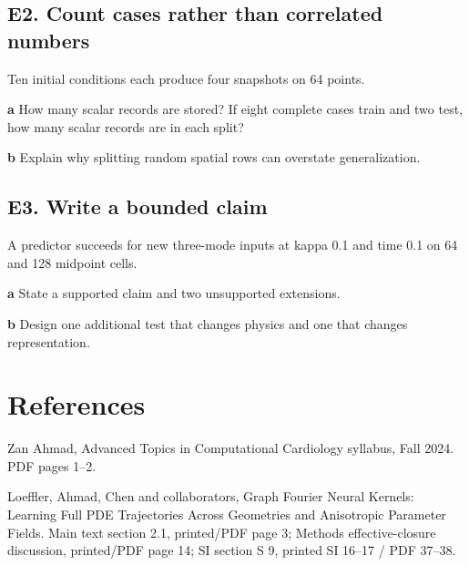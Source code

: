 \documentclass[11pt,letterpaper]{article}
\theoremstyle{definition}\newtheorem{definition}{Definition}\newtheorem{example}{Example}
\numberwithin{equation}{section}
\begin{document}
\par\noindent\begin{minipage}{\linewidth}
\subsection*{E2. Count cases rather than correlated numbers}
Ten initial conditions each produce four snapshots on 64 points.

\textbf{a} How many scalar records are stored? If eight complete cases train and two test, how many scalar records are in each split?

\end{minipage}\par\medskip
\textbf{b} Explain why splitting random spatial rows can overstate generalization.

\par\noindent\begin{minipage}{\linewidth}
\subsection*{E3. Write a bounded claim}
A predictor succeeds for new three-mode inputs at kappa 0.1 and time 0.1 on 64 and 128 midpoint cells.

\textbf{a} State a supported claim and two unsupported extensions.

\end{minipage}\par\medskip
\textbf{b} Design one additional test that changes physics and one that changes representation.

\section*{References}
\noindent\begin{minipage}{\linewidth}
Zan Ahmad, Advanced Topics in Computational Cardiology syllabus, Fall 2024. PDF pages 1--2.

\end{minipage}\par\medskip
\noindent\begin{minipage}{\linewidth}
Loeffler, Ahmad, Chen and collaborators, Graph Fourier Neural Kernels: Learning Full PDE Trajectories Across Geometries and Anisotropic Parameter Fields. Main text section 2.1, printed/PDF page 3; Methods effective-closure discussion, printed/PDF page 14; SI section S 9, printed SI 16--17 / PDF 37--38.

\end{minipage}\par\medskip
\end{document}
